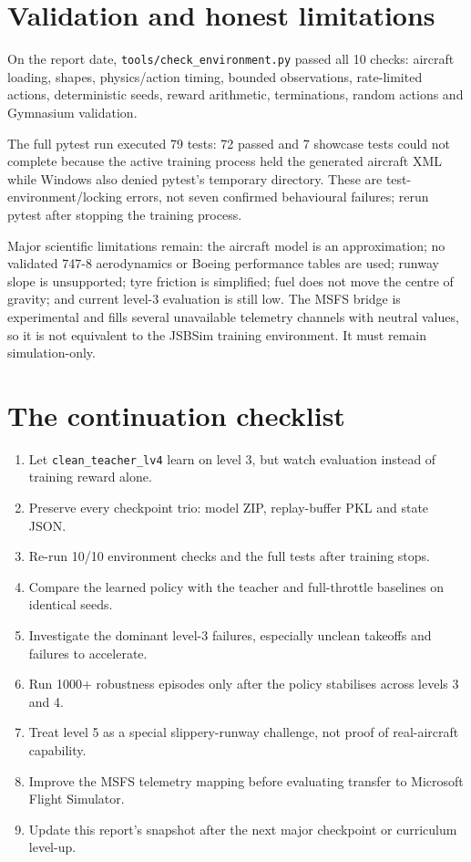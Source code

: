 \documentclass[11pt,a4paper]{article}
\begin{document}
\section{Validation and honest limitations}
On the report date, \texttt{tools/check\_environment.py} passed all 10 checks: aircraft loading, shapes, physics/action timing, bounded observations, rate-limited actions, deterministic seeds, reward arithmetic, terminations, random actions and Gymnasium validation.

The full pytest run executed 79 tests: 72 passed and 7 showcase tests could not complete because the active training process held the generated aircraft XML while Windows also denied pytest's temporary directory. These are test-environment/locking errors, not seven confirmed behavioural failures; rerun pytest after stopping the training process.

Major scientific limitations remain: the aircraft model is an approximation; no validated 747-8 aerodynamics or Boeing performance tables are used; runway slope is unsupported; tyre friction is simplified; fuel does not move the centre of gravity; and current level-3 evaluation is still low. The MSFS bridge is experimental and fills several unavailable telemetry channels with neutral values, so it is not equivalent to the JSBSim training environment. It must remain simulation-only.
\section{The continuation checklist}
\begin{enumerate}
\item Let \texttt{clean\_teacher\_lv4} learn on level 3, but watch evaluation instead of training reward alone.
\item Preserve every checkpoint trio: model ZIP, replay-buffer PKL and state JSON.
\item Re-run 10/10 environment checks and the full tests after training stops.
\item Compare the learned policy with the teacher and full-throttle baselines on identical seeds.
\item Investigate the dominant level-3 failures, especially unclean takeoffs and failures to accelerate.
\item Run 1000+ robustness episodes only after the policy stabilises across levels 3 and 4.
\item Treat level 5 as a special slippery-runway challenge, not proof of real-aircraft capability.
\item Improve the MSFS telemetry mapping before evaluating transfer to Microsoft Flight Simulator.
\item Update this report's snapshot after the next major checkpoint or curriculum level-up.
\end{enumerate}
\end{document}
